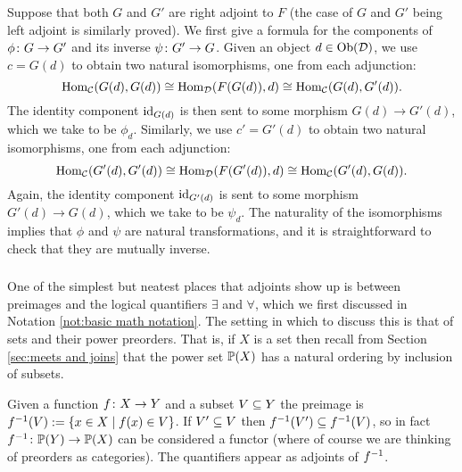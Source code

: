 \documentclass[CT4S-EN-RU]{subfiles}
\begin{document}
\begin{proofENG}
Suppose that both $G$ and $G'$ are right adjoint to $F$ (the case of $G$ and $G'$ being left adjoint is similarly proved). We first give a formula for the components of $\phi\taking G\to G'$ and its inverse $\psi\taking G'\to G$. Given an object $d\in\Ob(\mcD)$, we use $c=G(d)$ to obtain two natural isomorphisms, one from each adjunction: 
$$\Hom_\mcC(G(d),G(d))\iso\Hom_\mcD(F(G(d)),d)\iso\Hom_\mcC(G(d),G'(d)).$$
The identity component $\id_{G(d)}$ is then sent to some morphism $G(d)\to G'(d)$, which we take to be $\phi_d$. Similarly, we use $c'=G'(d)$ to obtain two natural isomorphisms, one from each adjunction:
$$\Hom_\mcC(G'(d),G'(d))\iso\Hom_\mcD(F(G'(d)),d)\iso\Hom_\mcC(G'(d),G(d)).$$
Again, the identity component $\id_{G'(d)}$ is sent to some morphism $G'(d)\to G(d)$, which we take to be $\psi_d$. The naturality of the isomorphisms implies that $\phi$ and $\psi$ are natural transformations, and it is straightforward to check that they are mutually inverse.
\end{proofENG}

\begin{proofRUS}
\end{proofRUS}


\subsubsection{}

\begin{blockENG}
One of the simplest but neatest places that adjoints show up is between preimages and the logical quantifiers $\exists$ and $\forall$, which we first discussed in Notation \ref{not:basic math notation}.  The setting in which to discuss this is that of sets and their power preorders. That is, if $X$ is a set then recall from Section \ref{sec:meets and joins} that the power set $\PP(X)$ has a natural ordering by inclusion of subsets. 
\end{blockENG}

\begin{blockRUS}
\end{blockRUS}

\begin{blockENG}
Given a function $f\taking X\to Y$ and a subset $V\ss Y$ the preimage is $f^\m1(V):=\{x\in X\|f(x)\in V\}$. If $V'\ss V$ then $f^\m1(V')\ss f^\m1(V)$, so in fact $f^\m1\taking\PP(Y)\to\PP(X)$ can be considered a functor (where of course we are thinking of preorders as categories). The quantifiers appear as adjoints of $f^\m1$.
\end{blockENG}
\end{document}
